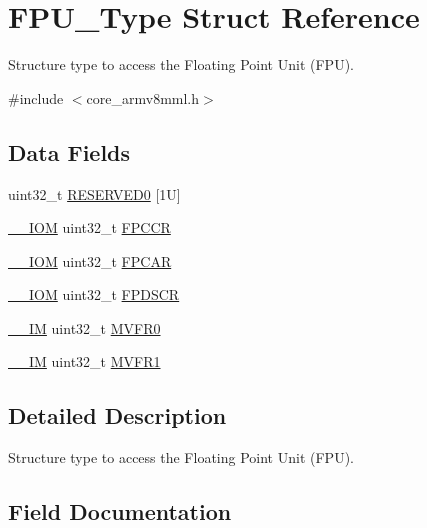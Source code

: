 \hypertarget{struct_f_p_u___type}{}\section{F\+P\+U\+\_\+\+Type Struct Reference}
\label{struct_f_p_u___type}


Structure type to access the Floating Point Unit (F\+PU).  




{\ttfamily \#include $<$core\+\_\+armv8mml.\+h$>$}

\subsection*{Data Fields}
\begin{DoxyCompactItemize}
\item 
uint32\+\_\+t \mbox{\hyperlink{struct_f_p_u___type_affae06cd6df5e9fe9a92994052fd3bec}{R\+E\+S\+E\+R\+V\+E\+D0}} \mbox{[}1\+U\mbox{]}
\item 
\mbox{\hyperlink{core__cm4_8h_ab6caba5853a60a17e8e04499b52bf691}{\+\_\+\+\_\+\+I\+OM}} uint32\+\_\+t \mbox{\hyperlink{struct_f_p_u___type_a242040bad11980d6250848a44cc967e3}{F\+P\+C\+CR}}
\item 
\mbox{\hyperlink{core__cm4_8h_ab6caba5853a60a17e8e04499b52bf691}{\+\_\+\+\_\+\+I\+OM}} uint32\+\_\+t \mbox{\hyperlink{struct_f_p_u___type_a4fa83b560b046f9cec201c68fbe33507}{F\+P\+C\+AR}}
\item 
\mbox{\hyperlink{core__cm4_8h_ab6caba5853a60a17e8e04499b52bf691}{\+\_\+\+\_\+\+I\+OM}} uint32\+\_\+t \mbox{\hyperlink{struct_f_p_u___type_a05a8c9a999e6ca4ff19f30c93ec50217}{F\+P\+D\+S\+CR}}
\item 
\mbox{\hyperlink{core__cm4_8h_a4cc1649793116d7c2d8afce7a4ffce43}{\+\_\+\+\_\+\+IM}} uint32\+\_\+t \mbox{\hyperlink{struct_f_p_u___type_a9b0103b438c8922eaea5624f71afbbc8}{M\+V\+F\+R0}}
\item 
\mbox{\hyperlink{core__cm4_8h_a4cc1649793116d7c2d8afce7a4ffce43}{\+\_\+\+\_\+\+IM}} uint32\+\_\+t \mbox{\hyperlink{struct_f_p_u___type_a0a610dc4212de3ce1ad62e9afa76c728}{M\+V\+F\+R1}}
\end{DoxyCompactItemize}


\subsection{Detailed Description}
Structure type to access the Floating Point Unit (F\+PU). 

\subsection{Field Documentation}
\mbox{\label{struct_f_p_u___type_a4fa83b560b046f9cec201c68fbe33507}} 

